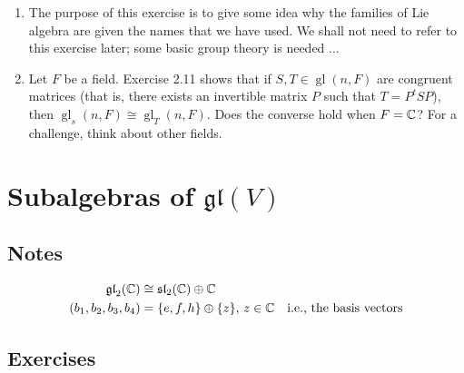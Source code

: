 \documentclass[12pt,a4paper]{report}
\newcommand{\GL}{\operatorname{gl}}
\begin{document}
\begin{enumerate}[label=4.\arabic*]
\item The purpose of this exercise is to give some idea why the families of Lie algebra are given the names that we have used.  We shall not need to refer to this exercise later;  some basic group theory is needed $\dots$

\item Let $F$ be a field.  Exercise 2.11 shows that if $S,T \in \GL(n,F)$ are congruent matrices (that is, there exists an invertible matrix $P$ such that $T=P^tSP$), then $\GL_s(n,F) \cong \GL_T(n,F)$.  Does the converse hold when $F = \mathbb{C}$?  For a challenge, think about other fields.
\end{enumerate}

\chapter{Subalgebras of $\mathfrak{gl}(V)$}

\section{Notes}

\begin{remark}[\textbf{From video: \footnote{\url{https://www.youtube.com/watch?v=4D8ko6Uz_M8&list=PLVMgvCDIRy1zJ6iJHLC_lWgIwY4AhviZ-&index=3}}}]

\begin{align*}
	\mathfrak{gl}_2(\mathbb{C}) &\cong \mathfrak{sl}_2(\mathbb{C})\oplus \mathbb{C} \\
	(b_1,b_2,b_3,b_4) &= \{e,f,h\}\oplus\{z\},\, z\in \mathbb{C} &\text{i.e., the basis vectors}
\end{align*}
\end{remark}

\section{Exercises}
\end{document}
